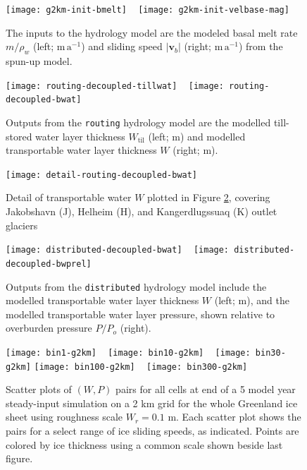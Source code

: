 \documentclass[gmd]{copernicus}   %
\newcommand{\text}{\textrm}
\newcommand\bv{\mathbf{v}}
\newcommand{\Wtil}{W_{\text{til}}}
\begin{document}
\newcommand{\grnht}{3.4in}

\begin{figure}[ht]
\mbox{\texttt{[image: g2km-init-bmelt]} \,
\texttt{[image: g2km-init-velbase-mag]}}
\caption{The inputs to the hydrology model are the modeled basal melt rate $m/\rho_w$ (left; $\mathrm{m}\,\mathrm{a}^{-1}$) and sliding speed $|\bv_b|$ (right; $\mathrm{m}\,\mathrm{a}^{-1}$) from the spun-up model.}
\label{fig:Greenhydroinputs}
\end{figure}

\begin{figure}[ht]
\mbox{\texttt{[image: routing-decoupled-tillwat]} \,
\texttt{[image: routing-decoupled-bwat]}}
\caption{Outputs from the \texttt{routing} hydrology model are the modelled till-stored water layer thickness $\Wtil$ (left; $\mathrm{m}$) and modelled transportable water layer thickness $W$ (right; $\mathrm{m}$).}
\label{fig:Greenroutingresults}
\end{figure}

\begin{figure}[ht]
\texttt{[image: detail-routing-decoupled-bwat]}
\caption{Detail of transportable water $W$ plotted in Figure \ref{fig:Greenroutingresults}, covering Jakobshavn (J), Helheim (H), and Kangerdlugssuaq (K) outlet glaciers}
\label{fig:Greenroutingdetail}
\end{figure}

\begin{figure}[ht]
\mbox{\texttt{[image: distributed-decoupled-bwat]} \,
\texttt{[image: distributed-decoupled-bwprel]}}
\caption{Outputs from the \texttt{distributed} hydrology model include the modelled transportable water layer thickness $W$ (left; $\mathrm{m}$), and the modelled transportable water layer pressure, shown relative to overburden pressure $P/P_o$ (right).}
\label{fig:Greendistributedresults}
\end{figure}

\newcommand{\myheight}{1.8in}
\begin{figure}[ht]
\mbox{\texttt{[image: bin1-g2km]} \, \texttt{[image: bin10-g2km]} \, \texttt{[image: bin30-g2km]}}
\mbox{\texttt{[image: bin100-g2km]} \,
\texttt{[image: bin300-g2km]}}
\caption{Scatter plots of $(W,P)$ pairs for all cells at end of a 5 model year steady-input simulation on a 2 km grid for the whole Greenland ice sheet using roughness scale $W_r = 0.1$ m.  Each scatter plot shows the pairs for a select range of ice sliding speeds, as indicated.  Points are colored by ice thickness using a common scale shown beside last figure.}
\label{fig:GreenisPofW}
\end{figure}
\end{document}
